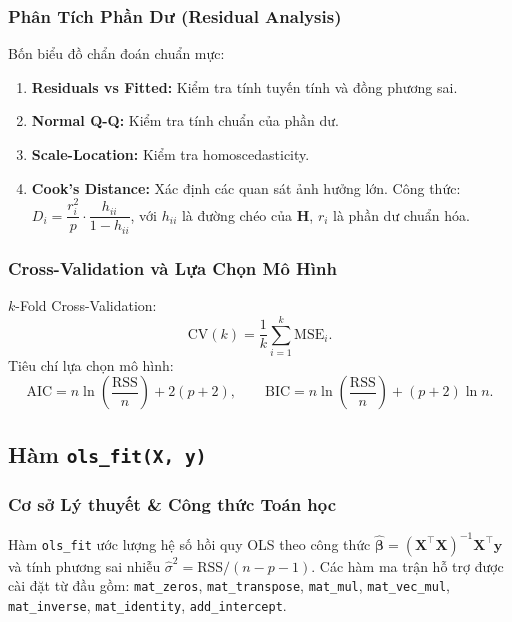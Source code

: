 \subsubsection{Phân Tích Phần Dư (Residual Analysis)}

Bốn biểu đồ chẩn đoán chuẩn mực:
\begin{enumerate}
    \item \textbf{Residuals vs Fitted:} Kiểm tra tính tuyến tính và đồng phương sai.
    \item \textbf{Normal Q-Q:} Kiểm tra tính chuẩn của phần dư.
    \item \textbf{Scale-Location:} Kiểm tra homoscedasticity.
    \item \textbf{Cook's Distance:} Xác định các quan sát ảnh hưởng lớn.
        Công thức: $D_i = \dfrac{r_i^2}{p} \cdot \dfrac{h_{ii}}{1 - h_{ii}}$,
        với $h_{ii}$ là đường chéo của $\mathbf{H}$, $r_i$ là phần dư chuẩn hóa.
\end{enumerate}

\subsubsection{Cross-Validation và Lựa Chọn Mô Hình}

$k$-Fold Cross-Validation:
\begin{equation}
    \mathrm{CV}(k) = \frac{1}{k}\sum_{i=1}^{k}\mathrm{MSE}_i.
\end{equation}
Tiêu chí lựa chọn mô hình:
\begin{equation}
    \mathrm{AIC} = n\ln\!\left(\frac{\mathrm{RSS}}{n}\right) + 2(p+2), \qquad
    \mathrm{BIC} = n\ln\!\left(\frac{\mathrm{RSS}}{n}\right) + (p+2)\ln n.
\end{equation}

\subsection{Hàm \texttt{ols\_fit(X, y)}}

\subsubsection{Cơ sở Lý thuyết \& Công thức Toán học}

Hàm \texttt{ols\_fit} ước lượng hệ số hồi quy OLS theo công thức
$\hat{\boldsymbol{\beta}} = (\mathbf{X}^\top\mathbf{X})^{-1}\mathbf{X}^\top\mathbf{y}$
và tính phương sai nhiễu $\hat{\sigma}^2 = \mathrm{RSS}/(n-p-1)$.
Các hàm ma trận hỗ trợ được cài đặt từ đầu gồm:
\texttt{mat\_zeros}, \texttt{mat\_transpose}, \texttt{mat\_mul},
\texttt{mat\_vec\_mul}, \texttt{mat\_inverse}, \texttt{mat\_identity},
\texttt{add\_intercept}.

